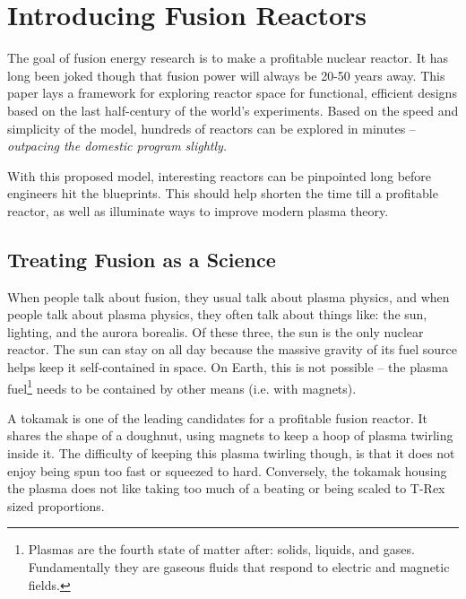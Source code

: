 %
%
%
%
%
%
%
%

\chapter{Introducing Fusion Reactors}

The goal of fusion energy research is to make a profitable nuclear reactor. It has long been joked though that fusion power will always be 20-50 years away. This paper lays a framework for exploring reactor space for functional, efficient designs based on the last half-century of the world's experiments. Based on the speed and simplicity of the model, hundreds of reactors can be explored in minutes -- \emph{outpacing the domestic program slightly.}

With this proposed model, interesting reactors can be pinpointed long before engineers hit the blueprints. This should help shorten the time till a profitable reactor, as well as illuminate ways to improve modern plasma theory.

\section{Treating Fusion  as a Science}

When people talk about fusion, they usual talk about plasma physics, and when people talk about plasma physics, they often talk about things like: the sun, lighting, and the aurora borealis. Of these three, the sun is the only nuclear reactor. The sun can stay on all day because the massive gravity of its fuel source helps keep it self-contained in space. On Earth, this is not possible -- the plasma fuel\footnote{Plasmas are the fourth state of matter after: solids, liquids, and gases. Fundamentally they are gaseous fluids that respond to electric and magnetic fields.} needs to be contained by other means (i.e. with magnets).

A tokamak is one of the leading candidates for a profitable fusion reactor. It shares the shape of a doughnut, using magnets to keep a hoop of plasma twirling inside it. The difficulty of keeping this plasma twirling though, is that it does not enjoy being spun too fast or squeezed to hard. Conversely, the tokamak housing the plasma does not like taking too much of a beating or being scaled to T-Rex sized proportions.

